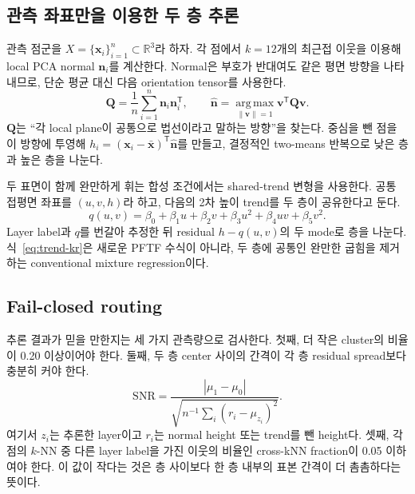 \documentclass[12pt,a4paper]{article}
\begin{document}
\subsection{관측 좌표만을 이용한 두 층 추론}

관측 점군을 $X=\{\mathbf{x}_i\}_{i=1}^{n}\subset\mathbb{R}^3$라 하자. 각
점에서 $k=12$개의 최근접 이웃을 이용해 local PCA normal
$\mathbf{n}_i$를 계산한다. Normal은 부호가 반대여도 같은 평면 방향을
나타내므로, 단순 평균 대신 다음 orientation tensor를 사용한다.
\begin{equation}
 \mathbf{Q}=\frac{1}{n}\sum_{i=1}^{n}\mathbf{n}_i\mathbf{n}_i^{\mathsf T},
 \qquad
 \widehat{\mathbf{n}}=\operatorname*{arg\,max}_{\|\mathbf{v}\|=1}
 \mathbf{v}^{\mathsf T}\mathbf{Q}\mathbf{v}.
 \label{eq:normal-kr}
\end{equation}
$\mathbf{Q}$는 ``각 local plane이 공통으로 법선이라고 말하는 방향''을
찾는다. 중심을 뺀 점을 이 방향에 투영해
$h_i=(\mathbf{x}_i-\bar{\mathbf{x}})^{\mathsf T}\widehat{\mathbf{n}}$를 만들고,
결정적인 two-means 반복으로 낮은 층과 높은 층을 나눈다.

두 표면이 함께 완만하게 휘는 합성 조건에서는 shared-trend 변형을 사용한다.
공통 접평면 좌표를 $(u,v,h)$라 하고, 다음의 2차 높이 trend를 두 층이
공유한다고 둔다.
\begin{equation}
 q(u,v)=\beta_0+\beta_1u+\beta_2v+\beta_3u^2+
          \beta_4uv+\beta_5v^2.
 \label{eq:trend-kr}
\end{equation}
Layer label과 $q$를 번갈아 추정한 뒤 residual $h-q(u,v)$의 두 mode로 층을
나눈다. 식~\eqref{eq:trend-kr}은 새로운 PFTF 수식이 아니라, 두 층에 공통인
완만한 굽힘을 제거하는 conventional mixture regression이다.

\subsection{Fail-closed routing}

추론 결과가 믿을 만한지는 세 가지 관측량으로 검사한다. 첫째, 더 작은
cluster의 비율이 0.20 이상이어야 한다. 둘째, 두 층 center 사이의 간격이
각 층 residual spread보다 충분히 커야 한다.
\begin{equation}
 \mathrm{SNR}=\frac{|\mu_1-\mu_0|}
 {\sqrt{n^{-1}\sum_i(r_i-\mu_{z_i})^2}}.
 \label{eq:snr-kr}
\end{equation}
여기서 $z_i$는 추론한 layer이고 $r_i$는 normal height 또는 trend를 뺀
height다. 셋째, 각 점의 $k$-NN 중 다른 layer label을 가진 이웃의 비율인
cross-kNN fraction이 0.05 이하여야 한다. 이 값이 작다는 것은 층 사이보다
한 층 내부의 표본 간격이 더 촘촘하다는 뜻이다.
\end{document}
